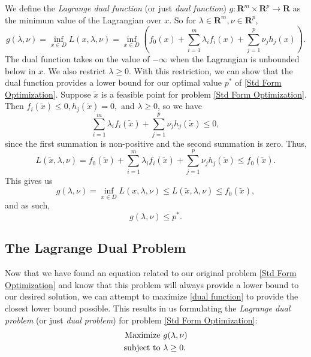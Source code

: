 	We define the \emph{Lagrange dual function} (or just \emph{dual function}) $g: \mathbf{R}^m \times \mathbf{R}^p \rightarrow \mathbf{R}$ as the minimum value of the Lagrangian over $x$. So for $\lambda \in \mathbf{R}^m , \nu \in \mathbf{R}^p$, 
	\begin{equation} \label{dual function}
		g(\lambda, \nu) = \inf_{x \in D} L(x, \lambda, \nu) = \inf_{x \in D} \left(f_0 (x) + \sum_{i = 1}^{m} \lambda_i f_i (x) + \sum_{j = 1}^{p} \nu_j h_j (x)\right).
	\end{equation}
	The dual function takes on the value of $- \infty$ when the Lagrangian is unbounded below in $x$. We also restrict $\lambda \geq 0$. With this restriction, we can show that the dual function provides a lower bound for our optimal value $p^*$ of \eqref{Std Form Optimization}. Suppose $\tilde{x}$ is a feasible point for problem \eqref{Std Form Optimization}. Then $f_i (\tilde{x}) \leq 0, h_j (\tilde{x}) = 0, $ and $\lambda \geq  0$, so we have 
	$$
	\sum_{i = 1}^{m} \lambda_i f_i (\tilde{x}) + \sum_{j = 1}^{p} \nu_j h_j (\tilde{x}) \leq 0,
	$$
	since the first summation is non-positive and the second summation is zero. Thus,
	$$
	L(\tilde{x}, \lambda, \nu) = f_0 (\tilde{x}) + \sum_{i = 1}^{m} \lambda_i f_i (\tilde{x}) + \sum_{j = 1}^{p} \nu_j h_j (\tilde{x}) \leq f_0 (\tilde{x}).
	$$
	This gives us
	$$
	g(\lambda, \nu) = \inf_{x \in D} L(x, \lambda, \nu) \leq L(\tilde{x}, \lambda, \nu) \leq f_0 (\tilde{x}),
	$$
	and as such, 
	\begin{equation} \label{Primal Lower Bound}
		g(\lambda, \nu) \leq p^*.
	\end{equation}
	
	\subsection{The Lagrange Dual Problem}
	Now that we have found an equation related to our original problem \eqref{Std Form Optimization} and know that this problem will always provide a lower bound to our desired solution, we can attempt to maximize \eqref{dual function} to provide the closest lower bound possible. This results in us formulating the \emph{Lagrange dual problem} (or just \emph{dual problem}) for problem \eqref{Std Form Optimization}:
	\begin{equation} \label{dual problem}
		\begin{aligned}
			\textnormal{Maximize } & g(\lambda, \nu) \\
			\textnormal{subject to } & \lambda \geq 0.
		\end{aligned}
	\end{equation}
	
